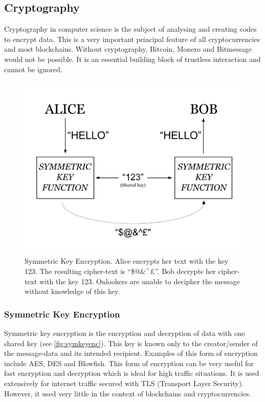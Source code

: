\documentclass{article}
\begin{document}
\subsection{Cryptography}
Cryptography in computer science is the subject of analysing and creating codes to encrypt data. This is a very important principal feature of all cryptocurrencies and most blockchains. Without cryptography, Bitcoin, Monero and Bitmessage would not be possible. It is an essential building block of trustless interaction and cannot be ignored.

\begin{figure}[h]
    \centering
    \includegraphics[width=0.5\linewidth]{Images/Diagrams/symmetric_key_encryption.png}
    \caption{Symmetric Key Encryption. Alice encrypts her text with the key 123. The resulting cipher-text is ``\$@\&\textasciicircum£''. Bob decrypts her cipher-text with the key 123. Onlookers are unable to decipher the message without knowledge of this key.}
    \label{fig:symkeyenc}
\end{figure}
\newpage
\subsubsection{Symmetric Key Encryption}
Symmetric key encryption is the encryption and decryption of data with one shared key (see \autoref{fig:symkeyenc}). This key is known only to the creator/sender of the message-data and its intended recipient.
Examples of this form of encryption include AES\cite{aes}, DES and Blowfish. This form of encryption can be very useful for fast encryption and decryption which is ideal for high traffic situations. It is used extensively for internet traffic secured with TLS (Transport Layer Security). However, it used very little in the context of blockchains and cryptocurrencies.
\end{document}
